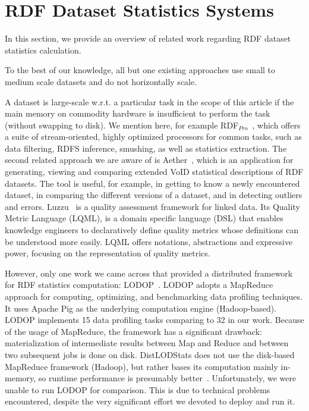 \section{RDF Dataset Statistics Systems}
In this section, we provide an overview of related work regarding RDF dataset statistics calculation.

To the best of our knowledge, all but one existing approaches use small to medium scale datasets and do not horizontally scale.

A dataset is large-scale w.r.t. a particular task in the scope of this article if the main memory on commodity hardware is insufficient to perform the task (without swapping to disk). 
We mention here, for example RDF$_{Pro}$~\cite{SAC-2015-CorcoglionitiRM}, which offers a suite of stream-oriented, highly optimized processors for common tasks, such as data filtering, RDFS inference, smushing, as well as statistics extraction. 
The second related approach we are aware of is Aether~\cite{makela2014aether}, which is an application for generating, viewing and comparing extended VoID statistical descriptions of RDF datasets.
The tool is useful, for example, in getting to know a newly encountered dataset, in comparing the different versions of a dataset, and in detecting outliers and errors.
Luzzu~\cite{debattista2016luzzu} is a quality assessment framework for linked data.
Its Quality Metric Language (LQML), is a domain specific language (DSL) that enables knowledge engineers to declaratively define quality metrics whose definitions can be understood more easily. LQML offers notations, abstractions and expressive power, focusing on the representation of quality metrics.

However, only one work we came across that provided a distributed framework for RDF statistics computation: LODOP~\cite{Forchhammer:PROFILES:14}. 
LODOP adopts a MapReduce approach for computing, optimizing, and benchmarking data profiling techniques.
It uses Apache Pig as the underlying computation engine (Hadoop-based). 
LODOP implements 15 data profiling tasks comparing to 32 in our work. 
Because of the usage of MapReduce, the framework has a significant drawback: materialization of intermediate results between Map and Reduce and between two subsequent jobs is done on disk.
DistLODStats does not use the disk-based MapReduce framework (Hadoop), but rather bases its computation mainly in-memory, so runtime performance is presumably better~\cite{Shi:2015:CTM:2831360.2831365}.
Unfortunately, we were unable to run LODOP for comparison. This is due to technical problems encountered, despite the very significant effort we devoted to deploy and run it.

